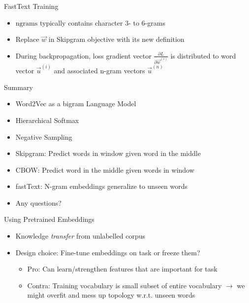 
\begin{vbframe}{FastText Training}

\vfill

\begin{itemize}
\item $\mathrm{ngrams}$ typically contains character 3- to 6-grams
\item Replace $\vec w$ in Skipgram objective with its new definition
\item During backpropagation, loss gradient vector $\frac{\partial L}{\partial \vec w^{(i)}}$ is distributed to word vector $\vec u^{(i)}$ and associated n-gram vectors $\vec u^{(n)}$
\end{itemize}

\vfill

\end{vbframe}


\begin{vbframe}{Summary}

\vfill

\begin{itemize}
	\item Word2Vec as a bigram Language Model
	\item Hierarchical Softmax
	\item Negative Sampling
	\item Skipgram: Predict words in window given word in the middle
	\item CBOW: Predict word in the middle given words in window
	\item fastText: N-gram embeddings generalize to unseen words
	\item Any questions?
\end{itemize}

\vfill

\end{vbframe}


\begin{vbframe}{Using Pretrained Embeddings}

\vfill

\begin{itemize}
	\item Knowledge \emph{transfer} from unlabelled corpus
	\item Design choice: Fine-tune embeddings on task or freeze them?
		\begin{itemize}
			\item Pro: Can learn/strengthen features that are important for task
			\item Contra: Training vocabulary is small subset of entire vocabulary $\rightarrow$ we might overfit and mess up topology w.r.t. unseen words
		\end{itemize}
\end{itemize}

\vfill

\end{vbframe}

